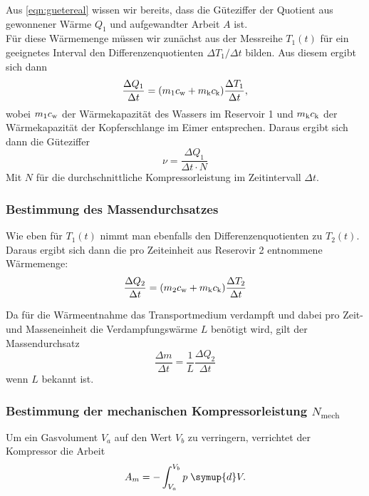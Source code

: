 Aus \ref{eqn:guetereal} wissen wir bereits, dass die Güteziffer der Quotient aus gewonnener Wärme 
$Q_1$ und aufgewandter Arbeit $A$ ist. \\
Für diese Wärmemenge müssen wir zunächst aus der Messreihe $T_1(t)$ für ein geeignetes Interval 
den Differenzenquotienten $\Delta T_1 / \Delta t$ bilden. Aus diesem ergibt sich dann
\begin{equation}
	\frac{\Delta Q_1}{\Delta t}
	= (m_1 c_\text w + m_\text k c_\text k) \frac{\Delta T_1}{\Delta t},
	\label{eqn:bestgueteziffer1}
\end{equation}
wobei $m_1c_\text w$ der Wärmekapazität des Wassers im Reservoir 1 und $m_\text k c_\text k$ der
Wärmekapazität der Kopferschlange im Eimer entsprechen. Daraus ergibt sich dann die 
Güteziffer
\begin{equation}
	\nu = \frac{\Delta Q_1}{\Delta t \cdot N}
	\label{eqn:messgueteziffer}
\end{equation}
Mit $N$ für die durchschnittliche Kompressorleistung im Zeitintervall $\Delta t$.

\subsubsection{Bestimmung des Massendurchsatzes}

Wie eben für $T_1(t)$ nimmt man ebenfalls den Differenzenquotienten zu $T_2(t)$. Daraus 
ergibt sich dann die pro Zeiteinheit aus Reserovir 2 entnommene Wärmemenge:
\begin{equation}
	\frac{\Delta Q_2}{\Delta t}
	= (m_2 c_\text w + m_\text k c_\text k)  \frac{\Delta T_2}{\Delta t}
	\label{eqn:waermeleitung2}
\end{equation}

Da für die Wärmeentnahme das Transportmedium verdampft und dabei pro Zeit- und Masseneinheit die 
Verdampfungswärme $L$ benötigt wird, gilt der Massendurchsatz
\begin{equation}
	\frac{\Delta m}{\Delta t}
	=
	\frac{1}{L} \frac{\Delta Q_2}{\Delta t}
	\label{eqn:massendurchsatz}
\end{equation}
wenn $L$ bekannt ist.

\subsubsection{Bestimmung der mechanischen Kompressorleistung 
$N_\text{mech}$}

Um ein Gasvolument $V_a$ auf den Wert $V_b$ zu verringern, verrichtet der Kompressor die Arbeit
\begin{equation}
	A_m = 
	-\int_{V_a}^{V_b} p \; \symup{d}V.
	\label{eqn:arbeit-kompresion}
\end{equation}

